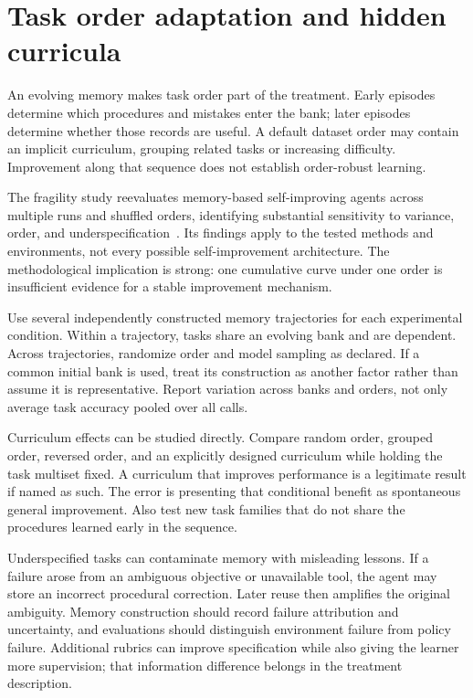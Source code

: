 \section{Task order adaptation and hidden curricula}\label{sec:C27:order}
An evolving memory makes task order part of the treatment. Early episodes determine which procedures and mistakes enter the bank; later episodes determine whether those records are useful. A default dataset order may contain an implicit curriculum, grouping related tasks or increasing difficulty. Improvement along that sequence does not establish order-robust learning.

The fragility study reevaluates memory-based self-improving agents across multiple runs and shuffled orders, identifying substantial sensitivity to variance, order, and underspecification~\cite{ye2026fragility}. Its findings apply to the tested methods and environments, not every possible self-improvement architecture. The methodological implication is strong: one cumulative curve under one order is insufficient evidence for a stable improvement mechanism.

Use several independently constructed memory trajectories for each experimental condition. Within a trajectory, tasks share an evolving bank and are dependent. Across trajectories, randomize order and model sampling as declared. If a common initial bank is used, treat its construction as another factor rather than assume it is representative. Report variation across banks and orders, not only average task accuracy pooled over all calls.

Curriculum effects can be studied directly. Compare random order, grouped order, reversed order, and an explicitly designed curriculum while holding the task multiset fixed. A curriculum that improves performance is a legitimate result if named as such. The error is presenting that conditional benefit as spontaneous general improvement. Also test new task families that do not share the procedures learned early in the sequence.

Underspecified tasks can contaminate memory with misleading lessons. If a failure arose from an ambiguous objective or unavailable tool, the agent may store an incorrect procedural correction. Later reuse then amplifies the original ambiguity. Memory construction should record failure attribution and uncertainty, and evaluations should distinguish environment failure from policy failure. Additional rubrics can improve specification while also giving the learner more supervision; that information difference belongs in the treatment description.

